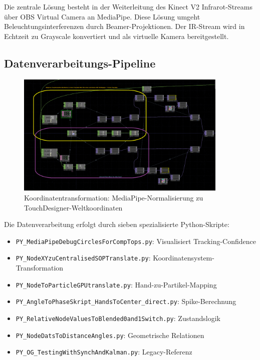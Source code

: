 Die zentrale Lösung besteht in der Weiterleitung des Kinect V2 Infrarot-Streams über OBS Virtual Camera an MediaPipe. Diese Lösung umgeht Beleuchtungsinterferenzen durch Beamer-Projektionen. Der IR-Stream wird in Echtzeit zu Grayscale konvertiert und als virtuelle Kamera bereitgestellt.

\subsection*{Datenverarbeitungs-Pipeline}

\begin{figure}[h]
    \centering
    \includegraphics[width=0.9\textwidth]{images/docupictures/NodeXYzuSOPZentriertemTranslate.png}
    \caption{Koordinatentransformation: MediaPipe-Normalisierung zu TouchDesigner-Weltkoordinaten}
    \label{fig:coordinate_transform}
\end{figure}

Die Datenverarbeitung erfolgt durch sieben spezialisierte Python-Skripte:

\begin{itemize}
    \item \texttt{PY\_MediaPipeDebugCirclesForCompTops.py}: Visualisiert Tracking-Confidence
    \item \texttt{PY\_NodeXYzuCentralisedSOPTranslate.py}: Koordinatensystem-Transformation
    \item \texttt{PY\_NodeToParticleGPUtranslate.py}: Hand-zu-Partikel-Mapping
    \item \texttt{PY\_AngleToPhaseSkript\_HandsToCenter\_direct.py}: Spike-Berechnung
    \item \texttt{PY\_RelativeNodeValuesToBlended0and1Switch.py}: Zustandslogik
    \item \texttt{PY\_NodeDatsToDistanceAngles.py}: Geometrische Relationen
    \item \texttt{PY\_OG\_TestingWithSynchAndKalman.py}: Legacy-Referenz
\end{itemize}

